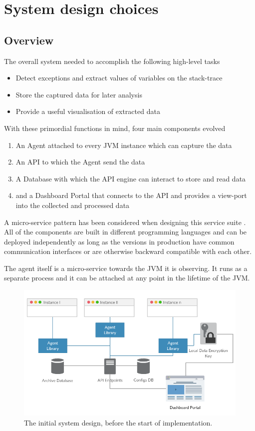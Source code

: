 \section{System design choices}
\subsection{Overview}


The overall system needed to accomplish the following high-level tasks
\begin{itemize}
  \item Detect exceptions and extract values of variables on the stack-trace
  \item Store the captured data for later analysis
  \item Provide a useful visualisation of extracted data
\end{itemize}

With these primordial functions in mind, four main components evolved
\begin{enumerate}
  \item An Agent attached to every JVM instance which can capture the data
  \item An API to which the Agent send the data
  \item A Database with which the API engine can interact to store and read data
  \item and a Dashboard Portal that connects to the API and provides a view-port into the collected and processed data
\end{enumerate}

A micro-service pattern has been considered when designing this service suite \cite{microservices}. All of the components are built in different programming languages and can be deployed independently as long as the versions in production have common communication interfaces or are otherwise backward compatible with each other.

The agent itself is a micro-service towards the JVM it is observing. It runs as a separate process and it can be attached at any point in the lifetime of the JVM.

\begin{figure}[H]
  \centering
    \includegraphics[width=\textwidth]{initial-design.png} 
  \caption[Initial system design diagram]{The initial system design, before the start of implementation.}

\end{figure} 

